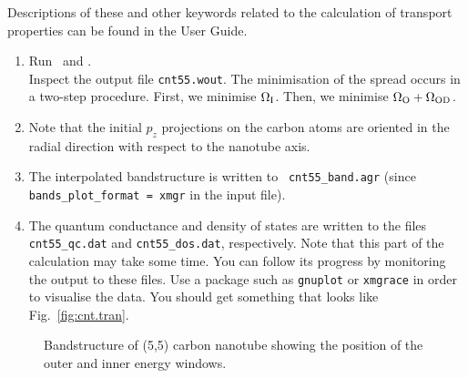\documentclass[a4paper,11pt,twoside]{article}
\begin{document}
Descriptions of these and other keywords related to the calculation of
transport properties can be found in the User Guide.

\begin{enumerate}
\item Run \pwscf\ and \wannier.\\
Inspect the output file {\tt cnt55.wout}. The minimisation of the
spread occurs in a two-step procedure. First, we minimise $\Omega_{\rm
  I}$. Then, we minimise $\Omega_{\rm O}+\Omega_{{\rm OD}}$.
\item Note that the initial $p_{z}$ projections on the carbon atoms
are oriented in the radial direction with respect to the nanotube
axis.
\item The interpolated bandstructure is written to {\tt
cnt55\_band.agr} (since {\tt bands\_plot\_format = xmgr} in the input
file).
\item The quantum conductance and density of states are written to the
files {\tt cnt55\_qc.dat} and {\tt cnt55\_dos.dat}, respectively. 
Note that this part of the calculation may take some time. You can 
follow its progress by monitoring the output to these files. 
Use a package such as {\tt gnuplot} or {\tt xmgrace} in order to visualise
the data. You should get something that looks like Fig.~\ref{fig:cnt.tran}.
\end{enumerate}

\begin{figure}[h]
\begin{center}
\caption{Bandstructure of (5,5) carbon nanotube showing the position
  of the outer and inner energy windows.}
\label{fig:cnt.win}
\end{center}
\end{figure}
\end{document}
